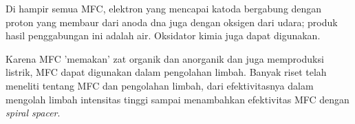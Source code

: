 \documentclass[10pt,a4paper,hidelinks]{article}
\begin{document}
Di hampir semua MFC, elektron yang mencapai katoda bergabung dengan proton yang membaur dari anoda dna juga dengan oksigen dari udara; produk hasil penggabungan ini adalah air. Oksidator kimia juga dapat digunakan.


Karena MFC 'memakan' zat organik dan anorganik dan juga memproduksi listrik, MFC dapat digunakan dalam pengolahan limbah. Banyak riset telah meneliti tentang MFC dan pengolahan limbah, dari efektivitasnya dalam mengolah limbah intensitas tinggi sampai menambahkan efektivitas MFC dengan \textit{spiral spacer}.
\end{document}
